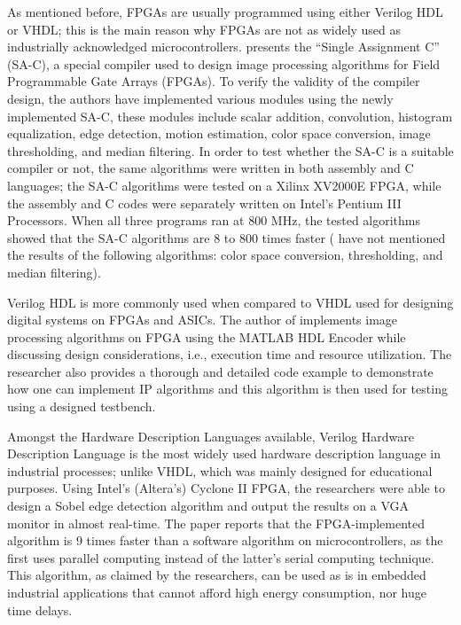\par	As mentioned before, FPGAs are usually programmed using either Verilog HDL or VHDL; this is the main reason why FPGAs are not as widely used as industrially acknowledged microcontrollers. \cite{three} presents the “Single Assignment C” (SA-C), a special compiler used to design image processing algorithms for Field Programmable Gate Arrays (FPGAs). To verify the validity of the compiler design, the authors have implemented various modules using the newly implemented SA-C, these modules include scalar addition, convolution, histogram equalization, edge detection, motion estimation, color space conversion, image thresholding, and median filtering. In order to test whether the SA-C is a suitable compiler or not, the same algorithms were written in both assembly and C languages; the SA-C algorithms were tested on a Xilinx XV2000E FPGA, while the assembly and C codes were separately written on Intel’s Pentium III Processors. When all three programs ran at 800 MHz, the tested algorithms showed that the SA-C algorithms are 8 to 800 times faster (\cite{three} have not mentioned the results of the following algorithms: color space conversion, thresholding, and median filtering). \newline
\par	Verilog HDL is more commonly used when compared to VHDL used for designing digital systems on FPGAs and ASICs. The author of \cite{thirteen} implements image processing algorithms on FPGA using the MATLAB HDL Encoder while discussing design considerations, i.e., execution time and resource utilization. The researcher also provides a thorough and detailed code example to demonstrate how one can implement IP algorithms and this algorithm is then used for testing using a designed testbench. \newline
\par	Amongst the Hardware Description Languages available, Verilog Hardware Description Language is the most widely used hardware description language in industrial processes; unlike VHDL, which was mainly designed for educational purposes. Using Intel’s (Altera’s) Cyclone II FPGA, the researchers were able to design a Sobel edge detection algorithm and output the results on a VGA monitor in almost real-time.  The paper \cite{twenty} reports that the FPGA-implemented algorithm is 9 times faster than a software algorithm on microcontrollers, as the first uses parallel computing instead of the latter's serial computing technique. This algorithm, as claimed by the researchers, can be used as is in embedded industrial applications that cannot afford high energy consumption, nor huge time delays. \newline
